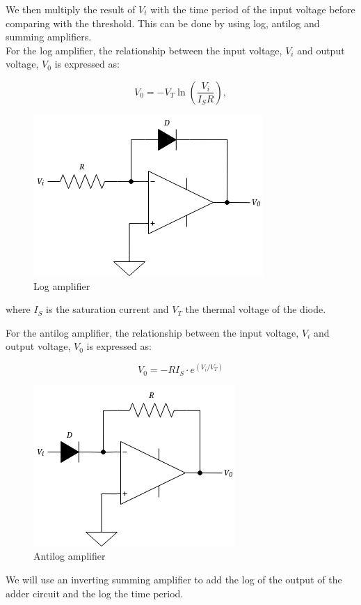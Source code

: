 \documentclass[a4paper, 12pt, oneside]{book}
\begin{document}
We then multiply the result of $V_t$ with the time period of the input voltage before comparing with the threshold. This can be done by using log, antilog and summing amplifiers.\\

For the log amplifier, the relationship between the input voltage, $V_i$ and output voltage, $V_0$ is expressed as:

\[V_0 = -V_T \ln \left(\frac{V_i}{I_S R}\right),\]

\begin{figure}[H]
  \centering
  \includegraphics[scale=0.5]{log.png}
  \caption{Log amplifier}
\end{figure}

where $I_S$ is the saturation current and $V_T$ the thermal voltage of the diode.

For the antilog amplifier, the relationship between the input voltage, $V_i$ and output voltage, $V_0$ is expressed as:

\[V_0 = -R I_S \cdot e^{(V_i/V_T)}\]

\begin{figure}[H]
  \centering
  \includegraphics[scale=0.5]{antilog.png}
  \caption{Antilog amplifier}
\end{figure}

We will use an inverting summing amplifier to add the log of the output of the adder circuit and the log the time period.
\end{document}
